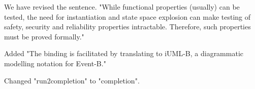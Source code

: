 \documentclass{response}
\begin{document}
\begin{response}
  We have revised the sentence. "While functional properties (usually) can be tested, the need for instantiation and state space explosion can make testing of safety, security and reliability properties intractable. Therefore, such properties must be proved formally."
\end{response}

\begin{comment}{Reviewer \#3}
  Page 2:

  * Top: The first paragraph can be expressed more clearly. That is:
  what is the approach taken? Is UML state charts mapped to iUML-B or
  not?
\end{comment}

\begin{response}
Added "The binding is facilitated by translating to iUML-B, a diagrammatic modelling notation for Event-B."
\end{response}

\begin{comment}{Reviewer \#3}
  Page 2:
  
  * Second paragraph appears complicated writing.
\end{comment}

\begin{response}
\end{response}

\begin{comment}{Reviewer \#3}
  Page 3:

* Listing 1: I think I would name that variable "run2completion" differently.
\end{comment}

\begin{response}
	Changed "run2completion" to "completion".
\end{response}


\begin{comment}{Reviewer \#3}
  Page 4:

  * Mid, it is not clear what this means:

  "The diagrammatic models are contained within an Event-B machine"
\end{comment}
\end{document}
